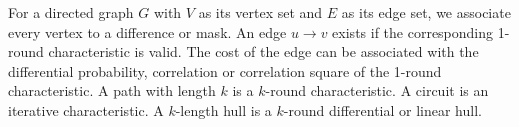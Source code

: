 For a directed graph $G$ with $V$ as its vertex set and $E$ as its edge set, we associate every vertex to a difference or mask. An edge $u\rightarrow v$ exists if the corresponding 1-round characteristic is valid. The cost of the edge can be associated with the differential probability, correlation or correlation square of the 1-round characteristic. A path with length $k$ is a $k$-round characteristic. A circuit is an iterative characteristic. A $k$-length hull is a $k$-round differential or linear hull. 


